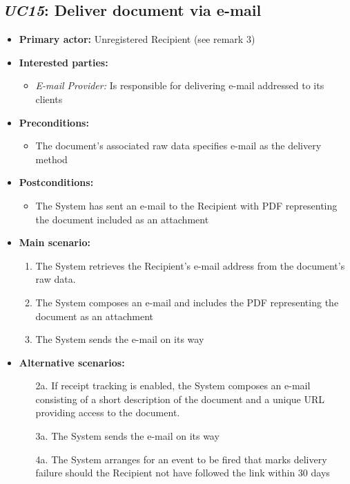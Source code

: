 \documentclass[a4paper,10pt]{article}
\begin{document}
\subsection{\emph{UC15}: Deliver document via e-mail}
\begin{itemize}
    \item \textbf{Primary actor:} Unregistered Recipient (see remark 3)
    \item \textbf{Interested parties:} 
        \begin{itemize}
            \item \textit{E-mail Provider:} Is responsible for delivering e-mail addressed to its clients
        \end{itemize}

    \item \textbf{Preconditions:}
        \begin{itemize}
            \item The document's associated raw data specifies e-mail as the delivery method
        \end{itemize}

    \item \textbf{Postconditions:}
        \begin{itemize}
            \item The System has sent an e-mail to the Recipient with PDF representing the document included as an attachment
        \end{itemize}
        
    \item \textbf{Main scenario:} 
    \begin{enumerate}
       \item The System retrieves the Recipient's e-mail address from the document's raw data.
       \item The System composes an e-mail and includes the PDF representing the document as an attachment
       \item The System sends the e-mail on its way
    \end{enumerate}

    \item \textbf{Alternative scenarios:} 
    \begin{enumerate}
        \item [2a.] If receipt tracking is enabled, the System composes an e-mail consisting of a short description of the document and a unique URL providing access to the document.
        \item [3a.] The System sends the e-mail on its way
        \item [4a.] The System arranges for an event to be fired that marks delivery failure should the Recipient not have followed the link within 30 days
    \end{enumerate}
    

\end{itemize}
\end{document}
